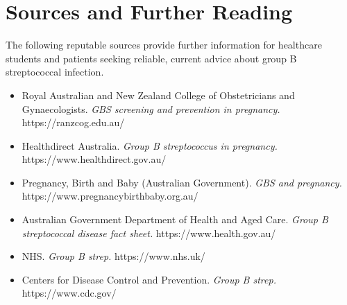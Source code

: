 \section*{Sources and Further Reading}
The following reputable sources provide further information for healthcare students and patients seeking reliable, current advice about group B streptococcal infection.

\begin{itemize}
    \item Royal Australian and New Zealand College of Obstetricians and Gynaecologists. \textit{GBS screening and prevention in pregnancy.} https://ranzcog.edu.au/
    \item Healthdirect Australia. \textit{Group B streptococcus in pregnancy.} https://www.healthdirect.gov.au/
    \item Pregnancy, Birth and Baby (Australian Government). \textit{GBS and pregnancy.} https://www.pregnancybirthbaby.org.au/
    \item Australian Government Department of Health and Aged Care. \textit{Group B streptococcal disease fact sheet.} https://www.health.gov.au/
    \item NHS. \textit{Group B strep.} https://www.nhs.uk/
    \item Centers for Disease Control and Prevention. \textit{Group B strep.} https://www.cdc.gov/
\end{itemize}
